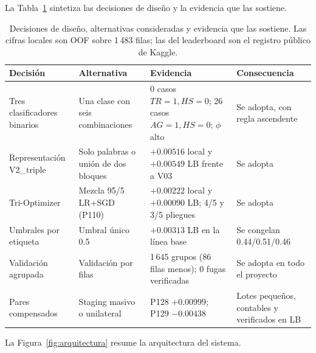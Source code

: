 La Tabla~\ref{tab:decisiones} sintetiza las decisiones de diseño y la
evidencia que las sostiene.

\begin{table}[t]
\centering
\caption{Decisiones de diseño, alternativas consideradas y evidencia que las
sostiene. Las cifras locales son OOF sobre 1\,483 filas; las del leaderboard
son el registro público de Kaggle.}
\label{tab:decisiones}
\small
\begin{tabularx}{\textwidth}{@{}>{\raggedright\arraybackslash}p{2.0cm}>{\raggedright\arraybackslash}p{2.6cm}X>{\raggedright\arraybackslash}p{2.3cm}@{}}
\toprule
Decisión & Alternativa & Evidencia & Consecuencia \\
\midrule
Tres clasificadores binarios & Una clase con seis combinaciones & 0 casos $TR=1,HS=0$; 26 casos $AG=1,HS=0$; $\phi$ alto & Se adopta, con regla ascendente \\
Representación V2\_triple & Solo palabras o unión de dos bloques & $+0.00516$ local y $+0.00549$ LB frente a V03 & Se adopta \\
Tri-Optimizer & Mezcla 95/5 LR+SGD (P110) & $+0.00222$ local y $+0.00090$ LB; 4/5 y 3/5 pliegues & Se adopta \\
Umbrales por etiqueta & Umbral único 0.5 & $+0.00313$ LB en la línea base & Se congelan 0.44/0.51/0.46 \\
Validación agrupada & Validación por filas & 1\,645 grupos (86 filas menos); 0 fugas verificadas & Se adopta en todo el proyecto \\
Pares compensados & Staging masivo o unilateral & P128 $+0.00999$; P129 $-0.00438$ & Lotes pequeños, contables y verificados en LB \\
\bottomrule
\end{tabularx}
\end{table}

La Figura~\ref{fig:arquitectura} resume la arquitectura del sistema.

